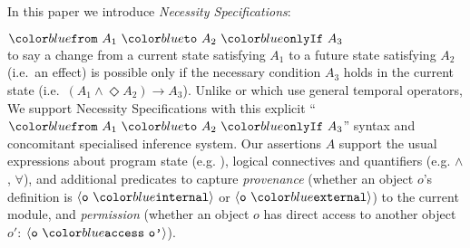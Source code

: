 In this paper we introduce \textit{Necessity Specifications}:\\
\strut \hspace{1.5in} $\onlyIf {A_1} {A_2} {A_3}$ \\
to say a change from a current state satisfying $A_1$ to a future
state satisfying $A_2$ (i.e.\ an effect) is possible only if the necessary condition
$A_3$ holds in the current state
%
(i.e.\ $(A_1 \wedge \Diamond A_2) \longrightarrow A_3$).
%
Unlike \citeauthor{VerX} or \citeauthor{FASE}
which use general temporal operators, 
We support Necessity Specifications with this explicit
%
``$\onlyIf {A_1} {A_2} {A_3}$'' syntax
%
and concomitant specialised inference system.
%
%
Our assertions $A$ support the usual expressions about program state
(e.g. ), logical connectives and quantifiers
(e.g. $\wedge$, $\forall$), and additional predicates
to capture \textit{provenance} (whether an object $o$'s definition is
$\internal{\texttt{o}}$ or $\external{\texttt{o}}$) to the current
module, and \textit{permission} \cite{miller-esop2013} (whether an
object $o$ has direct access to another object $o'$:
$\access{\texttt{o}}{\texttt{o'}}$).
 

  
 
 
